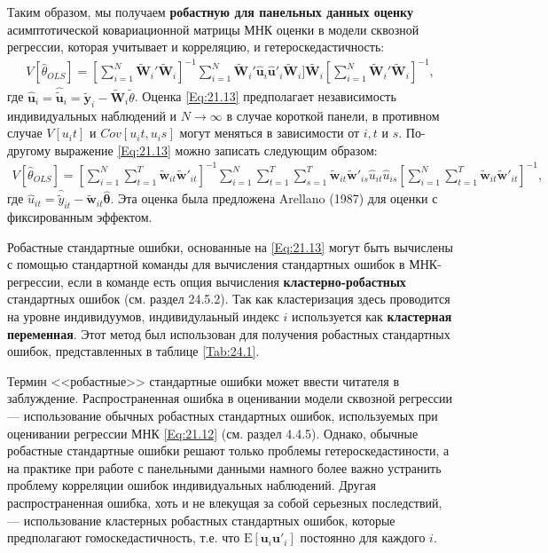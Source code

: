 Таким образом, мы получаем \textbf{робастную для панельных данных оценку} асимптотической ковариационной матрицы МНК оценки в  модели сквозной регрессии, которая учитывает и корреляцию, и гетероскедастичность:
 \begin{align}
V[\hat{\theta}_{OLS}]= \left[\sum^{N}_{i=1} \tilde{\mathbf W}_i'\tilde{\mathbf W}_i\right]^{-1} \sum^{N}_{i=1} \tilde{\mathbf W}_i' \hat{\mathbf u}_i \hat{\mathbf u}'_i\tilde{\mathbf W}_i]\tilde{\mathbf W_i} \left[\sum^{N}_{i=1} \tilde{\mathbf W}_i'\tilde{\mathbf W}_i\right]^{-1},
\label{Eq:21.13}
\end{align}
где $\hat{\mathbf u}_i=\hat{\tilde{\mathbf u}}_i=\tilde{\mathbf y}_i-\tilde{\mathbf W}_i \tilde{\theta}$. Оценка \ref{Eq:21.13} предполагает независимость индивидуальных наблюдений и $N \rightarrow \infty$ в случае короткой панели, в противном случае $V[u_it]$  и  $Cov[u_it, u_is]$ могут меняться в зависимости от $i, t$ и $s$. По-другому выражение \ref{Eq:21.13} можно записать следующим образом:
\begin{align}
V[\hat{\theta}_{OLS}]=\left[\sum^{N}_{i=1} \sum^{T}_{t=1} \tilde{\mathbf w}_{it}\tilde{\mathbf w}'_{it}\right]^{-1} \sum_{i=1}^{N} \sum_{t=1}^{T} \sum_{s=1}^T \tilde{\mathbf w}_{it}\tilde{\mathbf w}'_{is} \hat{u}_{it} \hat{ u}_{is} \left[\sum^{N}_{i=1} \sum^{T}_{t=1}\tilde{\mathbf w}_{it}\tilde{\mathbf w}'_{it}\right]^{-1}, 
\nonumber
\end{align}
где $\hat{u}_{it}=\hat{\tilde{y}}_{it}-\tilde{\mathbf w}_{it} \hat{\bm\theta}$. Эта оценка была предложена Arellano (1987) для оценки с фиксированным эффектом.

Робастные стандартные ошибки, основанные на \ref{Eq:21.13} могут быть вычислены с помощью стандартной команды для вычисления стандартных ошибок в МНК-регрессии, если в команде есть опция вычисления \textbf{кластерно-робастных} стандартных ошибок (см. раздел 24.5.2). Так как кластеризация здесь проводится на уровне индивидуумов, индивидулаьный индекс $i$ используется как \textbf{кластерная переменная}. Этот метод был использован для получения робастных стандартных ошибок, представленных в таблице \ref{Tab:24.1}.

Термин <<робастные>> стандартные ошибки может ввести читателя в заблуждение. Распространенная ошибка в оценивании модели сквозной регрессии --- использование обычных робастных стандартных ошибок, используемых при оценивании регрессии МНК \ref{Eq:21.12}  (см. раздел 4.4.5). Однако, обычные робастные стандартные ошибки решают только проблемы гетероскедастиности, а на практике при работе с панельными данными намного более важно устранить проблему корреляции ошибок  индивидуальных наблюдений. Другая распространенная ошибка, хоть и не влекущая за собой серьезных последствий, --- использование кластерных робастных стандартных ошибок, которые предполагают гомоскедастичность, т.е. что $\mathrm E[\mathbf u_i \mathbf u'_i]$ постоянно для каждого $i$.



